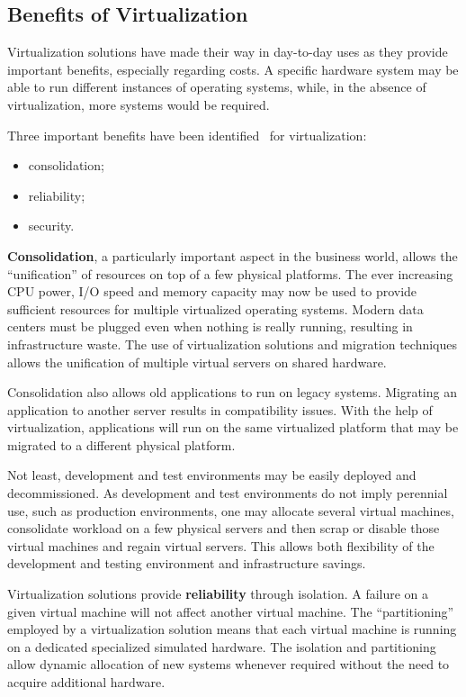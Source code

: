\subsection{Benefits of Virtualization}

Virtualization solutions have made their way in day-to-day uses as they
provide important benefits, especially regarding costs. A specific hardware
system may be able to run different instances of operating systems, while, in
the absence of virtualization, more systems would be required.

Three important benefits have been identified~\cite{best-damn-virt} for
virtualization:

\begin{itemize}
  \item consolidation;
  \item reliability;
  \item security.
\end{itemize}

\textbf{Consolidation}, a particularly important aspect in the business world,
allows the ``unification'' of resources on top of a few physical platforms. The
ever increasing CPU power, I/O speed and memory capacity may now be used to
provide sufficient resources for multiple virtualized operating systems.
Modern data centers must be plugged even when nothing is really running,
resulting in infrastructure waste. The use of virtualization solutions and
migration techniques allows the unification of multiple virtual servers on
shared hardware.

Consolidation also allows old applications to run on legacy systems. Migrating
an application to another server results in compatibility issues. With the
help of virtualization, applications will run on the same virtualized platform
that may be migrated to a different physical platform.

Not least, development and test environments may be easily deployed and
decommissioned. As development and test environments do not imply perennial
use, such as production environments, one may allocate several virtual
machines, consolidate workload on a few physical servers and then scrap or
disable those virtual machines and regain virtual servers. This allows both
flexibility of the development and testing environment and infrastructure
savings.

Virtualization solutions provide \textbf{reliability} through isolation. A
failure on a given virtual machine will not affect another virtual machine.
The ``partitioning'' employed by a virtualization solution means that each
virtual machine is running on a dedicated specialized simulated hardware. The
isolation and partitioning allow dynamic allocation of new systems whenever
required without the need to acquire additional hardware.

